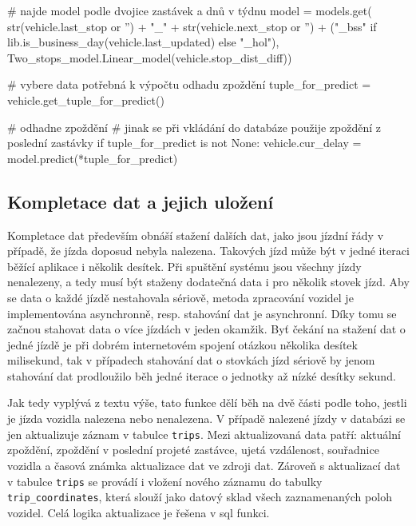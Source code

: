\begin{code}[frame=none]
# najde model podle dvojice zastávek a dnů v týdnu
model = models.get(
  str(vehicle.last_stop or '') + "_" +
  str(vehicle.next_stop or '') +
  ("_bss" if lib.is_business_day(vehicle.last_updated) else "_hol"),
  Two_stops_model.Linear_model(vehicle.stop_dist_diff))


# vybere data potřebná k výpočtu odhadu zpoždění
tuple_for_predict = vehicle.get_tuple_for_predict()


# odhadne zpoždění
# jinak se při vkládání do databáze použije zpoždění z poslední zastávky
if tuple_for_predict is not None:
  vehicle.cur_delay = model.predict(*tuple_for_predict)
\end{code}


\subsection{Kompletace dat a jejich uložení}


Kompletace dat především obnáší stažení dalších dat, jako jsou jízdní řády v případě, že jízda doposud nebyla nalezena. Takových jízd může být v jedné iteraci běžící aplikace i několik desítek. Při spuštění systému jsou všechny jízdy nenalezeny, a tedy musí být staženy dodatečná data i pro několik stovek jízd. Aby se data o každé jízdě nestahovala sériově, metoda zpracování vozidel je implementována asynchronně, resp. stahování dat je asynchronní. Díky tomu se začnou stahovat data o více jízdách v jeden okamžik. Byť čekání na stažení dat o jedné jízdě je při dobrém internetovém spojení otázkou několika desítek milisekund, tak v případech stahování dat o stovkách jízd sériově by jenom stahování dat prodloužilo běh jedné iterace o jednotky až nízké desítky sekund.


\bigbreak


Jak tedy vyplývá z textu výše, tato funkce dělí běh na dvě části podle toho, jestli je jízda vozidla nalezena nebo nenalezena. V případě nalezené jízdy v databázi se jen aktualizuje záznam v tabulce \verb-trips-. Mezi aktualizovaná data patří: aktuální zpoždění, zpoždění v poslední projeté zastávce, ujetá vzdálenost, souřadnice vozidla a časová známka aktualizace dat ve zdroji dat. Zároveň s aktualizací dat v tabulce \verb-trips- se provádí i vložení nového záznamu do tabulky \verb-trip_coordinates-, která slouží jako datový sklad všech zaznamenaných poloh vozidel. Celá logika aktualizace je řešena v \gls{sql} funkci.


